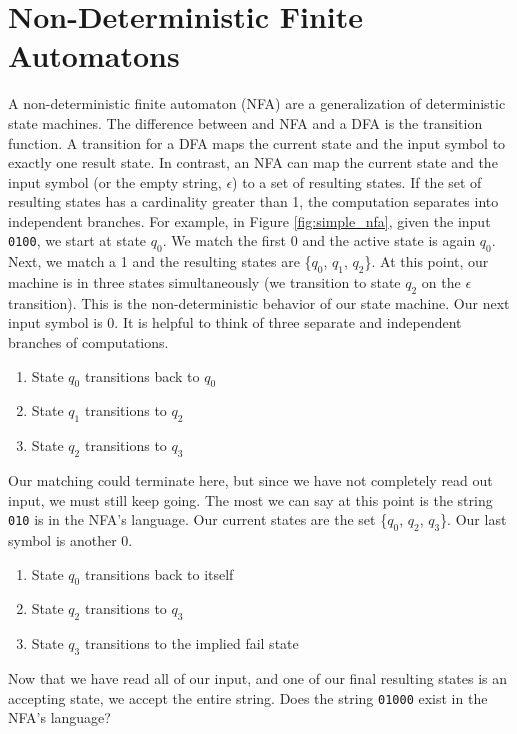 \section*{Non-Deterministic Finite Automatons}
A non-deterministic finite automaton (NFA) are a generalization of deterministic state machines.
The difference between and NFA and a DFA is the transition function.
A transition for a DFA maps the current state and the input symbol to exactly one result state.
In contrast, an NFA can map the current state and the input symbol (or the empty string, $\epsilon$) to a set of resulting states.
If the set of resulting states has a cardinality greater than 1, the computation separates into independent branches.
For example, in Figure \ref{fig:simple_nfa}, given the input \texttt{0100}, we start at state $q_0$.  We match the first 0 and the active state is again $q_0$.  Next, we match a 1 and the resulting states are \{$q_0$, $q_1$, $q_2$\}.
At this point, our machine is in three states simultaneously (we transition to state $q_2$ on the $\epsilon$ transition).
This is the non-deterministic behavior of our state machine.
Our next input symbol is 0.
It is helpful to think of three separate and independent branches of computations.
\begin{enumerate}
\item State $q_0$ transitions back to $q_0$
\item State $q_1$ transitions to $q_2$
\item State $q_2$ transitions to $q_3$
\end{enumerate}
Our matching could terminate here, but since we have not completely read out input, we must still keep going.
The most we can say at this point is the string \texttt{010} is in the NFA's language.
Our current states are the set \{$q_0$, $q_2$, $q_3$\}.
Our last symbol is another 0.
\begin{enumerate}
\item State $q_0$ transitions back to itself
\item State $q_2$ transitions to $q_3$
\item State $q_3$ transitions to the implied fail state
\end{enumerate}
Now that we have read all of our input, and one of our final resulting states is an accepting state, we accept the entire string.
Does the string \texttt{01000} exist in the NFA's language?

